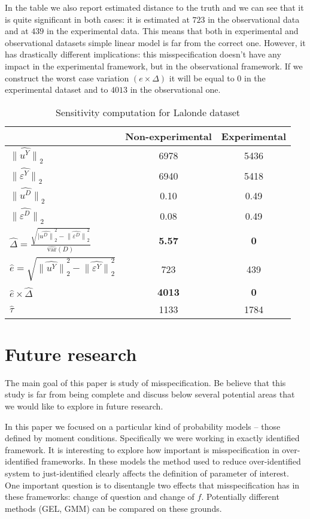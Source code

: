 \documentclass[12pt]{article}
\theoremstyle{plain}
\begin{document}
In the table we also report estimated distance to the truth and we can see that it is quite significant in both cases: it is estimated at $723$ in the observational data and at $439$ in the experimental data.  This means that both in experimental and observational datasets simple linear model is far from the correct one. However, it has drastically different implications: this misspecification doesn't have any impact in the experimental framework, but in the observational framework. If we construct the worst case variation $(e\times \Delta)$ it will be equal to $0$ in the experimental dataset and to $4013$ in the observational one. 
\begin{table}[h]
\centering\caption{Sensitivity computation for Lalonde dataset}\label{lalonde_table}
\begin{tabular}{l | c | c }
& Non-experimental & Experimental \\
\hline\hline
$\widehat{\|u^Y\|}_2$ & 6978 & 5436 \\
$\widehat{\|\varepsilon^Y\|}_2$ & 6940 & 5418 \\
$\widehat{\|u^D\|}_2$ & 0.10 & 0.49\\
$\widehat{\|\varepsilon^D\|}_2$ & 0.08 & 0.49 \\
$\hat\Delta = \frac{\sqrt{\widehat{|u^D\|}_2^2-\widehat{\|\varepsilon^D\|}_2^2}}{\hat{\text{var}}(D)}$ & \textbf{5.57} & \textbf{0}\\
$\hat e= \sqrt{\widehat{\|u^Y\|}_2^2- \widehat{\|\varepsilon^Y\|}^2_2}$ & 723  & 439\\
$\hat e\times\hat\Delta$   & \textbf{4013} & \textbf{0} \\
$\hat\tau$ & 1133 & 1784\\
\end{tabular}
\end{table}



\section{Future research}

The main goal of this paper is study of misspecification. Be believe that this study is far from being complete and discuss below several potential areas that we would like to explore in future research.

In this paper we focused on a particular kind of probability models -- those defined by moment conditions. Specifically we were working in exactly identified framework. It is interesting to explore how important is misspecification in over-identified frameworks. In these models the method used to reduce over-identified system to just-identified clearly affects the definition of parameter of interest. One important question is to disentangle two effects that misspecification has in these frameworks: change of question and change of $f$. Potentially different methods (GEL, GMM) can be compared on these grounds.
\end{document}
